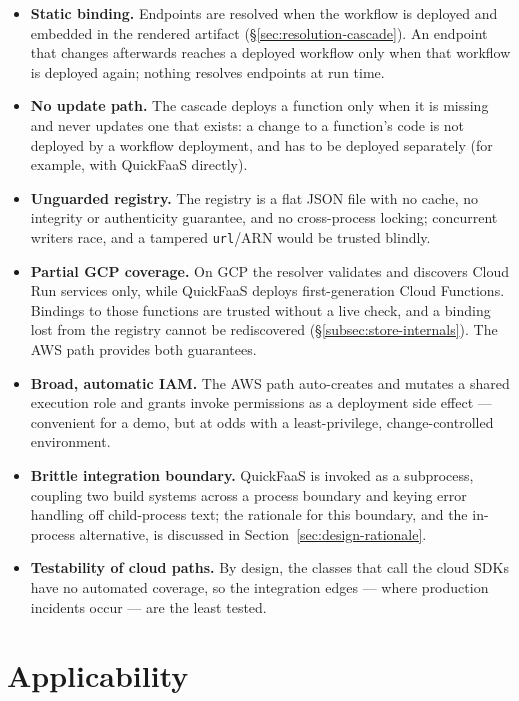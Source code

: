 \begin{itemize}
  \item \textbf{Static binding.} Endpoints are resolved when the workflow is deployed and embedded
  in the rendered artifact (\S\ref{sec:resolution-cascade}). An endpoint that changes afterwards
  reaches a deployed workflow only when that workflow is deployed again; nothing resolves
  endpoints at run time.
  \item \textbf{No update path.} The cascade deploys a function only when it is missing and never
  updates one that exists: a change to a function's code is not deployed by a workflow deployment,
  and has to be deployed separately (for example, with QuickFaaS directly).
  \item \textbf{Unguarded registry.} The registry is a flat JSON file with no cache, no integrity
  or authenticity guarantee, and no cross-process locking; concurrent writers race, and a tampered
  \texttt{url}/ARN would be trusted blindly.
  \item \textbf{Partial GCP coverage.} On GCP the resolver validates and discovers Cloud Run
  services only, while QuickFaaS deploys first-generation Cloud Functions. Bindings to those
  functions are trusted without a live check, and a binding lost from the registry cannot be
  rediscovered (\S\ref{subsec:store-internals}). The AWS path provides both guarantees.
  \item \textbf{Broad, automatic IAM.} The AWS path auto-creates and mutates a shared execution
  role and grants invoke permissions as a deployment side effect --- convenient for a demo, but at
  odds with a least-privilege, change-controlled environment.
  \item \textbf{Brittle integration boundary.} QuickFaaS is invoked as a subprocess, coupling two
  build systems across a process boundary and keying error handling off child-process text; the
  rationale for this boundary, and the in-process alternative, is discussed in
  Section~\ref{sec:design-rationale}.
  \item \textbf{Testability of cloud paths.} By design, the classes that call the cloud SDKs have
  no automated coverage, so the integration edges --- where production incidents occur --- are the
  least tested.
\end{itemize}

\section{Applicability}
\label{sec:concl-applicability}

